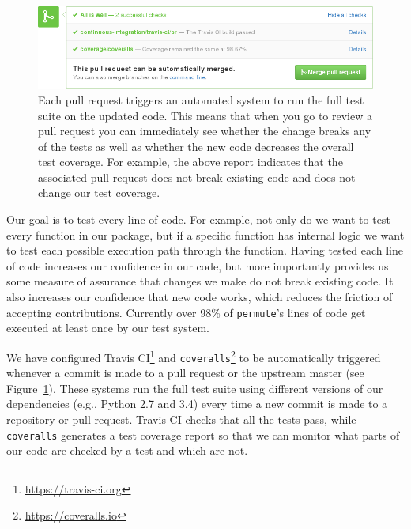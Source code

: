 \documentclass[]{article}
\begin{document}
\begin{figure}
  \begin{centering}
    \includegraphics[width=\textwidth]{_fig/pull-request-ci.png}\par
  \end{centering}

  \caption{\label{fig:pull-request}
  \small
    Each pull request triggers an automated system to run the full test suite on
    the updated code.
    This means that when you go to review a pull request you can immediately see
    whether the change breaks any of the tests as well as whether the new
    code decreases the overall test coverage.
    For example, the above report indicates that the associated pull request does not
    break existing code and does not change our test coverage.}
\end{figure}

Our goal is to test every line of code.
For example, not only do we want to test every function in our package, but if
a specific function has internal logic we want to test each possible execution
path through the function.
Having tested each line of code increases our confidence in our code, but
more importantly provides us some measure of assurance that changes we make do
not break existing code.
It also increases our confidence that new code works, which reduces the
friction of accepting contributions.
Currently over 98\% of \texttt{permute}'s lines of code get executed at least
once by our test system.

We have configured Travis CI\footnote{
  \url{https://travis-ci.org}
} 
and
\texttt{coveralls}\footnote{
  \url{https://coveralls.io}
}
to be automatically
triggered whenever a commit is made to a pull request or the upstream master
(see Figure~\ref{fig:pull-request}).
These systems run the full test suite using different versions of our
dependencies (e.g., Python 2.7 and 3.4) every time a new commit is made to a
repository or pull request.
Travis CI checks that all the tests pass, while \texttt{coveralls} generates a
test coverage report so that we can monitor what parts of our code are checked
by a test and which are not.
\end{document}
